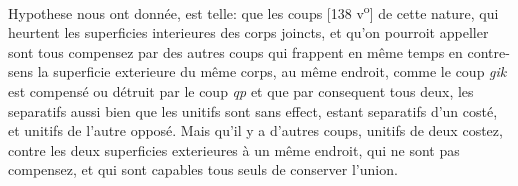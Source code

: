 \pstart {} Hypothese nous ont donn\'{e}e, est telle: que les coups
[138 v\textsuperscript{o}] de cette nature, qui heurtent les superficies interieures des corps joincts, et qu'on pourroit appeller  sont tous compensez par des autres coups  qui frappent en même temps en contre-sens la superficie exterieure du même corps, au même endroit, comme le coup \textit{gik} est compens\'{e} ou d\'{e}truit par le coup \textit{qp} et que par consequent tous deux, les separatifs aussi bien que les unitifs sont sans effect, estant separatifs d'un cost\'{e}, et unitifs de l'autre oppos\'{e}. Mais qu'il y a d'autres coups, unitifs de deux costez, contre les deux superficies exterieures \`{a} un même endroit, qui ne sont pas compensez, et qui sont capables tous seuls de conserver l'union.
\pend 
